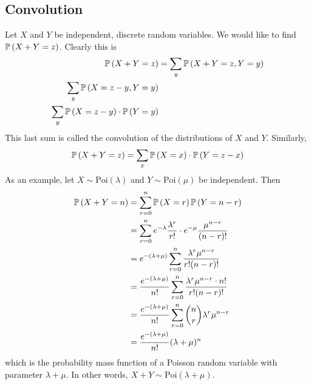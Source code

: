 \documentclass{article}
\begin{document}
\subsection{Convolution}
Let $X$ and $Y$ be independent, discrete random variables. We would like to find $\mathbb{P}\left({X + Y = z}\right)$. Clearly this is
\begin{align*}
    \mathbb{P}\left({X + Y = z}\right) & = \sum_y \mathbb{P}\left({X + Y = z, Y = y}\right) \\
    \sum_y \mathbb{P}\left({X = z-y, Y = y}\right)                        \\
    \sum_y \mathbb{P}\left({X = z-y}\right) \cdot \mathbb{P}\left({Y = y}\right)            \\
\end{align*}
This last sum is called the convolution of the distributions of $X$ and $Y$. Similarly,
\[ \mathbb{P}\left({X + Y = z}\right) = \sum_x \mathbb{P}\left({X = x}\right) \cdot \mathbb{P}\left({Y = z-x}\right) \]
As an example, let $X \sim \mathrm{Poi}(\lambda)$ and $Y \sim \mathrm{Poi}(\mu)$ be independent. Then
\begin{align*}
    \mathbb{P}\left({X + Y = n}\right) & = \sum_{r = 0}^n \mathbb{P}\left({X = r}\right) \mathbb{P}\left({Y = n - r}\right)                                              \\
                     & = \sum_{r = 0}^n e^{-\lambda} \frac{\lambda^r}{r!} \cdot e^{-\mu} \frac{\mu^{n-r}}{(n-r)!}  \\
                     & = e^{-(\lambda+\mu)} \sum_{r = 0}^n \frac{\lambda^r\mu^{n-r}}{r!(n-r)!}                     \\
                     & = \frac{e^{-(\lambda+\mu)}}{n!} \sum_{r = 0}^n \frac{\lambda^r\mu^{n-r} \cdot n!}{r!(n-r)!} \\
                     & = \frac{e^{-(\lambda+\mu)}}{n!} \sum_{r = 0}^n \binom{n}{r} \lambda^r\mu^{n-r}              \\
                     & = \frac{e^{-(\lambda+\mu)}}{n!} (\lambda + \mu)^n                                           \\
\end{align*}
which is the probability mass function of a Poisson random variable with parameter $\lambda + \mu$. In other words, $X + Y \sim \mathrm{Poi}(\lambda + \mu)$.
\end{document}
